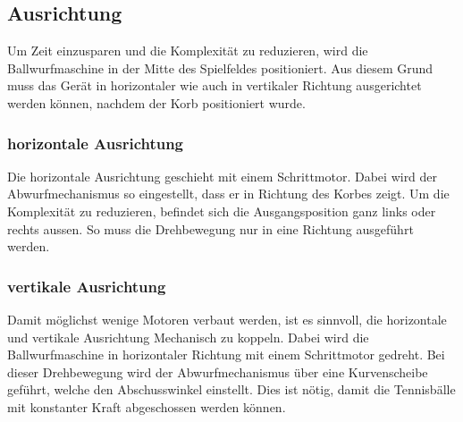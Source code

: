 \subsection{Ausrichtung}
Um Zeit einzusparen und die Komplexität zu reduzieren, wird die Ballwurfmaschine in der Mitte des Spielfeldes positioniert. Aus diesem Grund muss das Gerät in horizontaler wie auch in vertikaler Richtung ausgerichtet werden können, nachdem der Korb positioniert wurde. 

\subsubsection{horizontale Ausrichtung}
Die horizontale Ausrichtung geschieht mit einem Schrittmotor. Dabei wird der Abwurfmechanismus so eingestellt, dass er in Richtung des Korbes zeigt. Um die Komplexität zu reduzieren, befindet sich die Ausgangsposition ganz links oder rechts aussen. So muss die Drehbewegung nur in eine Richtung ausgeführt werden.

\subsubsection{vertikale Ausrichtung}
Damit möglichst wenige Motoren verbaut werden, ist es sinnvoll, die horizontale und vertikale Ausrichtung Mechanisch zu koppeln. Dabei wird die Ballwurfmaschine in horizontaler Richtung mit einem Schrittmotor gedreht. Bei dieser Drehbewegung wird der Abwurfmechanismus über eine Kurvenscheibe geführt, welche den Abschusswinkel einstellt. Dies ist nötig, damit die Tennisbälle mit konstanter Kraft abgeschossen werden können.
